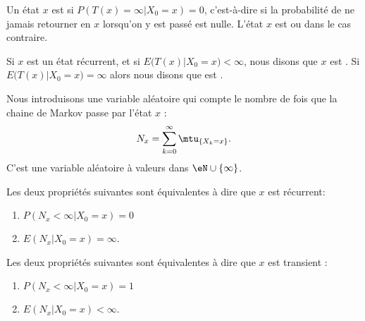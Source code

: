 \begin{definition}\label{DefWknULk}
	Un état \( x\) est  si \( P(T(x)=\infty|X_0=x)=0\), c'est-à-dire si la probabilité de ne jamais retourner en \( x\) lorsqu'on y est passé est nulle. L'état \( x\) est  ou  dans le cas contraire.

	Si \( x\) est un état récurrent, et si \( E\big( T(x)|X_0=x \big)<\infty\), nous disons que \( x\) est . Si \( E\big( T(x)|X_0=x \big)=\infty\) alors nous disons que est .
\end{definition}

Nous introduisons une variable aléatoire qui compte le nombre de fois que la chaine de Markov passe par l'état \( x\) :
\begin{equation}    \label{EqDefNxmtuXkn}
	N_x=\sum_{k=0}^{\infty}\mtu_{\{ X_k=x\}}.
\end{equation}
C'est une variable aléatoire à valeurs dans \( \eN\cup\{ \infty \}\).

\begin{proposition} \label{PropEquivEPrecuequiv}
	Les deux propriétés suivantes sont équivalentes à dire que \( x\) est récurrent:
	\begin{enumerate}
		\item
		      \( P(N_x<\infty|X_0=x)=0\)
		\item
		      \( E(N_x|X_0=x)=\infty\).
	\end{enumerate}
	Les deux propriétés suivantes sont équivalentes à dire que \( x\) est transient :
	\begin{enumerate}
		\item   \label{ItemiMnGpD}
		      \( P(N_x<\infty|X_0=x)=1\)
		\item
		      \( E(N_x|X_0=x)<\infty\).
	\end{enumerate}
\end{proposition}

